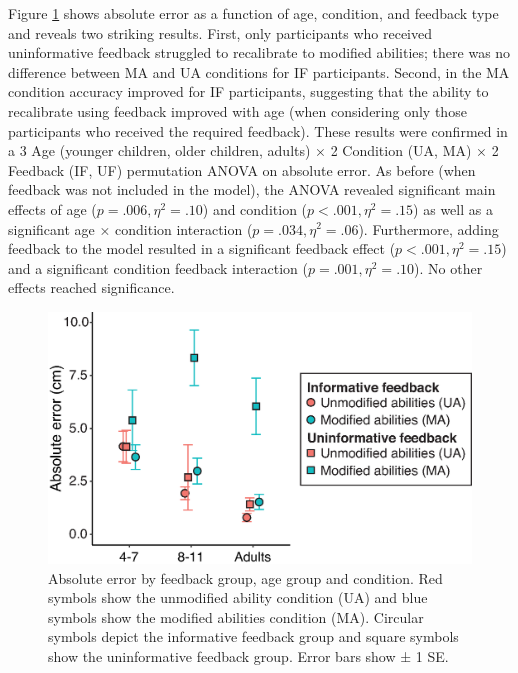 \documentclass[a4paper,man,natbib,floatsintext,noextraspace]{apa6}
\begin{document}
Figure \ref{fig:feedback} shows absolute error as a function of age, condition, and feedback type and reveals two striking results. First, only participants who received uninformative feedback struggled to recalibrate to modified abilities; there was no difference between MA and UA conditions for IF participants. Second, in the MA condition accuracy improved for IF participants, suggesting that the ability to recalibrate using feedback improved with age (when considering only those participants who received the required feedback). These results were confirmed in a 3 Age (younger children, older children, adults) × 2 Condition (UA, MA) × 2 Feedback (IF, UF) permutation ANOVA on absolute error. As before (when feedback was not included in the model), the ANOVA revealed significant main effects of age ($p = .006, \eta^{2} = .10$) and condition ($p < .001, \eta^{2} = .15$) as well as a significant age × condition interaction ($p = .034, \eta^{2} = .06$). Furthermore, adding feedback to the model resulted in a significant feedback effect ($p < .001, \eta^{2} = .15$) and a significant condition feedback interaction ($p = .001, \eta^{2} = .10$). No other effects reached significance. 

\begin{figure}[htb!]
\centering
\includegraphics[width=1\textwidth]{feedback.eps}
\caption{\label{fig:feedback}Absolute error by feedback group, age group and condition. Red symbols show the unmodified ability condition (UA) and blue symbols show the modified abilities condition (MA). Circular symbols depict the informative feedback group and square symbols show the uninformative feedback group. Error bars show ± 1 SE.}
\end{figure}
\end{document}
